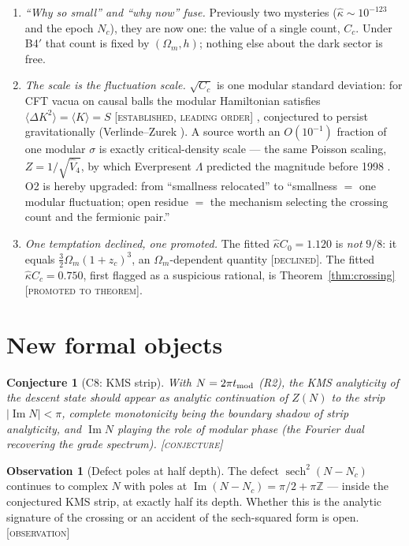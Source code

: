 \documentclass[11pt,reqno]{amsart}
\numberwithin{equation}{section}
\newtheorem{conjecture}[theorem]{Conjecture}
\theoremstyle{definition}
\newtheorem{observation}[theorem]{Observation}
\theoremstyle{remark}
\newcommand{\slab}[1]{\textup{[\textsc{#1}]}}
\newcommand{\sech}{\operatorname{sech}}
\begin{document}
\begin{enumerate}[label=\textup{(\roman*)},leftmargin=2.2em]
\item \emph{``Why so small'' and ``why now'' fuse.} Previously two
mysteries ($\hat\kappa\sim10^{-123}$ and the epoch $N_c$), they are now
one: the value of a single count, $C_c$. Under B4$'$ that count is fixed
by $(\Omega_m,h)$; nothing else about the dark sector is free.
\item \emph{The scale is the fluctuation scale.} $\sqrt{C_c}$ is one
modular standard deviation: for CFT vacua on causal balls the modular
Hamiltonian satisfies $\langle\Delta K^2\rangle=\langle K\rangle=S$
\slab{established, leading order}
\cite{Perlmutter2014,deBoer2018}, conjectured to persist gravitationally
(Verlinde--Zurek \cite{VZ2019}). A source worth an $O(10^{-1})$ fraction
of one modular $\sigma$ is exactly critical-density scale --- the same
Poisson scaling, $Z=1/\sqrt{\hat V_4}$, by which Everpresent $\Lambda$
predicted the magnitude before 1998 \cite{Zwane2018}. O2 is hereby
upgraded: from ``smallness relocated'' to ``smallness $=$ one modular
fluctuation; open residue $=$ the mechanism selecting the crossing count
and the fermionic pair.''
\item \emph{One temptation declined, one promoted.} The fitted
$\hat\kappa C_0=1.120$ is \emph{not} $9/8$: it equals
$\tfrac32\Omega_m(1+z_c)^3$, an $\Omega_m$-dependent quantity
\slab{declined}. The fitted $\hat\kappa C_c=0.750$, first flagged as a
suspicious rational, is Theorem~\ref{thm:crossing}
\slab{promoted to theorem}.
\end{enumerate}

\section{New formal objects}\label{sec:formal}

\begin{conjecture}[C8: KMS strip]\label{conj:C8}
With $N=2\pi t_{\rm mod}$ (R2), the KMS analyticity of the descent state
should appear as analytic continuation of $Z(N)$ to the strip
$|\operatorname{Im}N|<\pi$, complete monotonicity being the
boundary shadow of strip analyticity, and
$\operatorname{Im}N$ playing the role of modular phase (the Fourier dual
recovering the grade spectrum). \slab{conjecture}
\end{conjecture}

\begin{observation}[Defect poles at half depth]
The defect $\sech^2(N-N_c)$ continues to complex $N$ with poles at
$\operatorname{Im}(N-N_c)=\pi/2+\pi\mathbb Z$ --- inside the conjectured
KMS strip, at exactly half its depth. Whether this is the analytic
signature of the crossing or an accident of the sech-squared form is
open. \slab{observation}
\end{observation}
\end{document}
